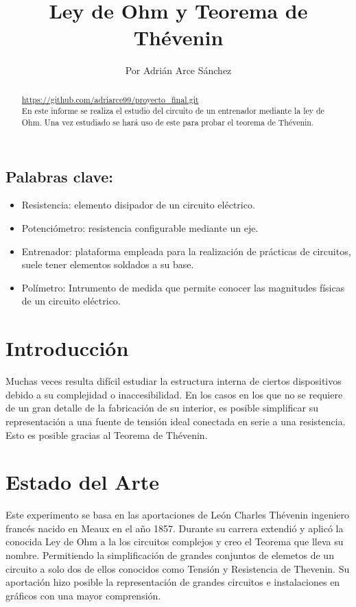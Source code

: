 \documentclass[a4paper,11pt]{article}
\begin{document}
\title{\textbf{Ley de Ohm y Teorema de Thévenin}}
\author{ Por Adrián Arce Sánchez}
\maketitle

\begin{abstract}
\url{https://github.com/adriarce99/proyecto_final.git}\\
En este informe se realiza el estudio del circuito de un entrenador mediante la ley de Ohm. Una vez estudiado se hará uso de este para probar el teorema de Thévenin.
\end{abstract}

\subsection*{Palabras clave:}
\begin{itemize}
\item Resistencia: elemento disipador de un circuito eléctrico.
\item Potenciómetro: resistencia configurable mediante un eje.
\item Entrenador: plataforma empleada para la realización de prácticas de circuitos, suele tener elementos soldados a su base.
\item Polímetro: Intrumento de medida que permite conocer las magnitudes físicas de un circuito eléctrico.
\end{itemize}







\section{Introducción}
Muchas veces resulta difícil estudiar la estructura interna de ciertos dispositivos debido a su complejidad o inaccesibilidad. En los casos en los que no se requiere de un gran detalle de la fabricación de su interior, es posible simplificar su representación a una fuente de tensión ideal conectada en serie a una resistencia. Esto es posible gracias al Teorema de Thévenin.

\section{Estado del Arte}
Este experimento se basa en las aportaciones de León Charles Thévenin ingeniero francés nacido en Meaux en el año 1857. Durante su carrera extendió y aplicó la conocida Ley de Ohm a la los circuitos complejos y creo el Teorema que lleva su nombre. Permitiendo la simplificación de grandes conjuntos de elemetos de un circuito a solo dos de ellos conocidos como Tensión y Resistencia de Thevenin. Su aportación hizo posible la representación de grandes circuitos e instalaciones en gráficos con una mayor comprensión.
\end{document}
